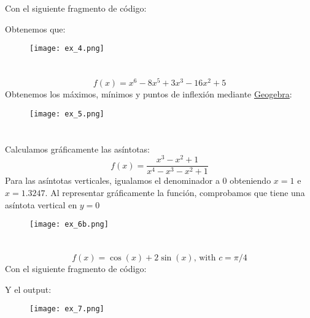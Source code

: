 \documentclass[12pt,a4paper,oneside,onecolumn]{article}
\begin{document}
	\section{}
	Con el siguiente fragmento de c\'odigo:
	
	Obtenemos que: 
	\begin{figure}[!h]
		\centering
		\texttt{[image: ex\_4.png]}
		\caption{}
		\label{fig:04}
	\end{figure}
	
	\section{}
	\[
	f(x) = x^6 - 8x^5 + 3x^3 - 16x^2 + 5
	\]
	Obtenemos los m\'aximos, m\'inimos y puntos de inflexi\'on mediante \href{https://www.geogebra.org/calculator}{\underline{Geogebra}}:
	\newline \newline \newline \newline \newline \newline \newline \newline \newline 
	
	\begin{figure}[!h]
		\centering
		\texttt{[image: ex\_5.png]}
		\caption{}
		\label{fig:05}
	\end{figure}

	\section{}
	Calculamos gr\'aficamente las as\'intotas:
	\[
		f(x) = \frac{x^3 - x^2 + 1}{x^4 - x^3 - x^2 + 1}
	\]
	Para las asíntotas verticales, igualamos el denominador a 0 obteniendo \(x = 1\) e \(x = 1.3247\).
	\newline Al representar gr\'aficamente la funci\'on, comprobamos que tiene una as\'intota vertical en \(y = 0\)
		 
	
	\begin{figure}[!h]
		\centering
		\texttt{[image: ex\_6b.png]}
		\caption{}
		\label{fig:06}
	\end{figure}
	
	\section{}
	\[
		f(x) = \cos{(x)} + 2\sin{(x)}\text{, with } c = \pi/4
	\]
	Con el siguiente fragmento de c\'odigo:
	
	Y el output:
	\begin{figure}[!h]
		\centering
		\texttt{[image: ex\_7.png]}
		\caption{}
		\label{fig:07}
	\end{figure}
\end{document}
